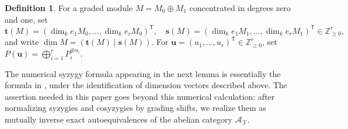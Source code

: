 \documentclass{amsart}
\theoremstyle{definition}
\newtheorem{dfn}[thm]{Definition}
\theoremstyle{remark}
\numberwithin{equation}{thm}
\def\A{\mathcal{A}}
\def\dimvec{\underline{\dim}}
\def\dim{\operatorname{dim}}
\def\ge{\geqslant}
\def\T{\mathsf{T}}
\def\X{\mathcal{X}}
\def\Z{\mathbb{Z}}
\def\bfs{\mathbf{s}}
\def\bft{\mathbf{t}}
\def\bfu{\mathbf{u}}
\begin{document}
\begin{dfn}
For a graded module $M=M_0\oplus M_1$ concentrated in degrees zero and one, set
$$
\bft(M)=(\dim_ke_1M_0,\ldots,\dim_ke_rM_0)^{\T},\quad
\bfs(M)=(\dim_ke_1M_1,\ldots,\dim_ke_rM_1)^{\T}\in\Z_{\ge0}^r,
$$
and write $\dimvec M=(\bft(M)\mid\bfs(M))$. 
For $\bfu=(u_1,\ldots,u_r)^{\T}\in\Z_{\ge0}^r$, set $P(\bfu)=\bigoplus_{i=1}^rP_i^{\oplus u_i}$.
\end{dfn}

The numerical syzygy formula appearing in the next lemma is essentially the formula in \cite[Lemma 2.2]{E}, under the identification of dimension vectors described above. The assertion needed in this paper goes beyond this numerical calculation: after normalizing syzygies and cosyzygies by grading shifts, we realize them as mutually inverse exact autoequivalences of the abelian category $\A_\X$.
\end{document}
